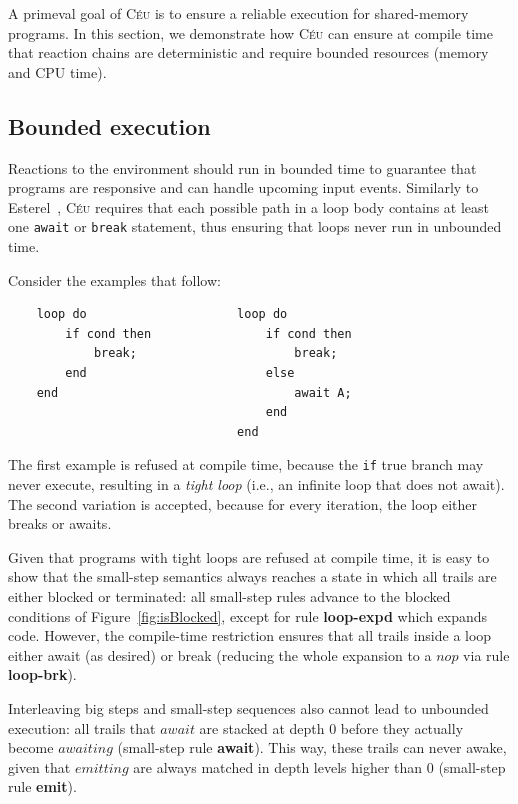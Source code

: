 \documentclass[preprint]{sigplanconf}
\newcommand{\CEU}{\textsc{C\'{e}u}\xspace}
\newcommand{\code}[1] {{\small{\texttt{#1}}}}
\newcommand{\1}{\;}
\newcommand{\2}{\;\;}
\newcommand{\3}{\;\;\;}
\newcommand{\5}{\;\;\;\;\;}
\begin{document}
A primeval goal of \CEU is to ensure a reliable execution for shared-memory 
programs.
In this section, we demonstrate how \CEU can ensure at compile time
that reaction chains are deterministic and require bounded resources (memory 
and CPU time).

\subsection{Bounded execution}
\label{sec.safety.bounded}

Reactions to the environment should run in bounded time to guarantee that 
programs are responsive and can handle upcoming input events.
Similarly to Esterel~\cite{esterel.ieee91}, \CEU requires that each possible 
path in a loop body contains at least one \code{await} or \code{break} 
statement, thus ensuring that loops never run in unbounded time.

Consider the examples that follow:

{\small
\begin{verbatim}
    loop do                     loop do
        if cond then                if cond then
            break;                      break;
        end                         else
    end                                 await A;
                                    end
                                end
\end{verbatim}
}

The first example is refused at compile time, because the \code{if} true branch 
may never execute, resulting in a \emph{tight loop} (i.e., an infinite loop 
that does not await).
The second variation is accepted, because for every iteration, the loop either 
breaks or awaits.


Given that programs with tight loops are refused at compile time, it is easy to 
show that the small-step semantics always reaches a state in which all trails 
are either blocked or terminated:
all small-step rules advance to the blocked conditions of 
Figure~\ref{fig:isBlocked}, except for rule \textbf{loop-expd} which expands 
code.
However, the compile-time restriction ensures that all trails inside a loop 
either await (as desired) or break (reducing the whole expansion to a $nop$ via 
rule \textbf{loop-brk}).

Interleaving big steps and small-step sequences also cannot lead to unbounded 
execution:
all trails that $await$ are stacked at depth $0$ before they actually become 
$awaiting$ (small-step rule \textbf{await}).
This way, these trails can never awake, given that $emitting$ are always 
matched in depth levels higher than $0$ (small-step rule \textbf{emit}).
\end{document}

